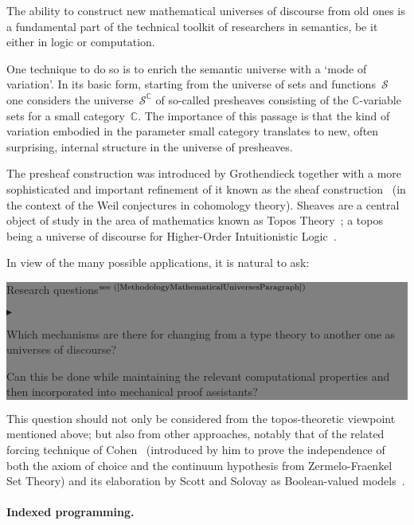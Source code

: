 \documentclass[11pt,twocolumn]{article}
\newenvironment{btritemize}
  {\begin{list}{\btr}
  {\setlength{\topsep}{2pt}
   \setlength{\partopsep}{2pt}
   \setlength{\itemsep}{2.5pt}
   \setlength{\parsep}{2.5pt}
   \setlength{\leftmargin}{1em}
   \setlength{\labelwidth}{.5em}}}
  {\end{list}}
\newcommand{\mytextsf}[1]{\textsf{\small #1}}
\newcommand{\btr}{$\blacktriangleright$}
\newcommand{\reqpsize}{8.113395cm}%
\newcommand{\reqs}[2]{\begin{center}\colorbox{grey}{\begin{minipage}{\reqpsize}
  \mytextsf{Research questions}\hfill$^{\mbox{\scriptsize see #1 }}$\\[-5.5mm]
  \begin{btritemize}
  \item #2
  \end{btritemize}
\end{minipage}}\end{center}}
\newcommand{\Set}{{\boldsymbol{\mathscr S}}}
\newcommand{\scat}[1]{\mathbb{#1}}
\begin{document}
The ability to construct new mathematical universes of discourse from old ones
is a fundamental part of the technical toolkit of researchers in semantics, be
it either in logic or computation.

One technique to do so is to enrich the semantic universe with a `mode of
variation'.  In its basic form, starting from the universe of sets and
functions~$\Set$ one considers the universe~$\Set^{\scat C}$ of so-called
presheaves consisting of the \mbox{$\scat C$-variable} sets for a small
category~$\scat C$.  The importance of this passage is that the kind of
variation embodied in the parameter small category translates to new, often
surprising, internal structure in the universe of presheaves.  

The presheaf construction was introduced by Grothendieck together with a
more sophisticated and important refinement of it known as the sheaf
construction~\cite{SGA4} (in the context of the Weil conjectures in
cohomology theory).  Sheaves are a central object of study in the area of
mathematics known as Topos Theory~\cite{Elephant}; a topos being a
universe of discourse for Higher-Order Intuitionistic
Logic~\cite{LambekScott}.  

In view of the many possible applications, it is natural to ask:
\reqs{(\ref{MethodologyMathematicalUniversesParagraph})}
  {Which mechanisms are there for changing from a type theory to another one
    as universes of discourse? 

    Can this be done while maintaining the relevant computational properties
    and then incorporated into mechanical proof assistants?}

This question should not only be considered from the topos-theoretic viewpoint
mentioned above; but also from other approaches, notably that of the related
forcing technique of Cohen~\cite{Cohen} (introduced by him to prove the
independence of both the axiom of choice and the continuum hypothesis from
Zermelo-Fraenkel Set Theory) and its elaboration by Scott and Solovay as
Boolean-valued models~\cite{ScottSolovay}.


\paragraph{Indexed programming.}
\label{IndexedProgrammingIntro}
\end{document}
